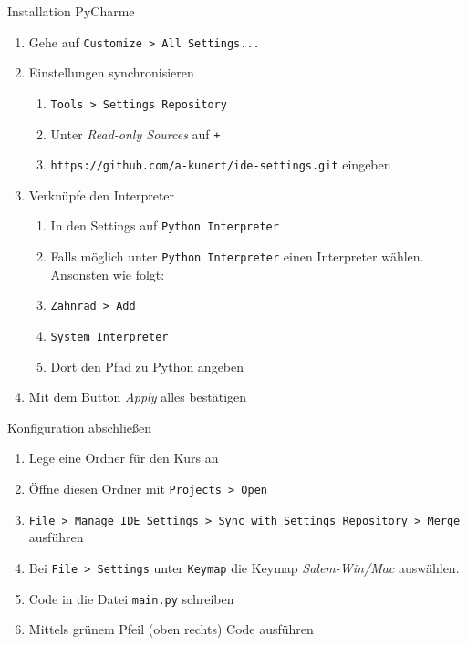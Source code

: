 \begin{frame}
	\begin{block}{Installation PyCharme}
		\vspace{2pt}
		\begin{enumerate}
			\item Gehe auf \texttt{Customize > All Settings...}
			\item Einstellungen synchronisieren
			\begin{enumerate}
				\item \texttt{Tools > Settings Repository}
				\item Unter \textit{Read-only Sources} auf \texttt{+}
				\item \texttt{https://github.com/a-kunert/ide-settings.git}	eingeben
			\end{enumerate}
			\item Verknüpfe den Interpreter
			\begin{enumerate}
				\item In den Settings auf \texttt{Python Interpreter}
				\item Falls möglich unter \texttt{Python Interpreter} einen Interpreter wählen. Ansonsten wie folgt: 
				\item \texttt{Zahnrad > Add}
				\item \texttt{System Interpreter}
				\item Dort den Pfad zu Python angeben
			\end{enumerate}
			\item Mit dem Button \textit{Apply} alles bestätigen
		\end{enumerate}
	\end{block}
\end{frame}

\begin{frame}
	\begin{block}{Konfiguration abschließen}
		\begin{enumerate}
		\item Lege eine Ordner für den Kurs an
		\item Öffne diesen Ordner mit \texttt{Projects > Open}
		\item \texttt{File > Manage IDE Settings > Sync with Settings Repository > Merge} ausführen
		\item Bei \texttt{File > Settings} unter \texttt{Keymap} die Keymap \textit{Salem-Win/Mac} auswählen. 
		\item Code in die Datei \texttt{main.py} schreiben
		\item Mittels grünem Pfeil (oben rechts) Code ausführen
	\end{enumerate}	
	\end{block}
\end{frame}